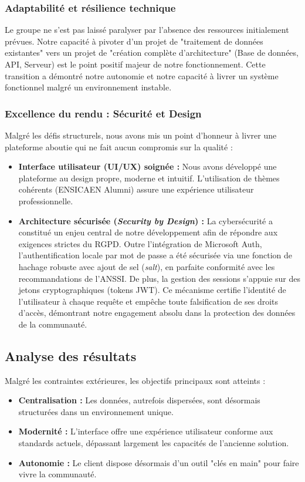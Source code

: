 \documentclass[a4paper,12pt]{article}
\begin{document}
\subsubsection{Adaptabilité et résilience technique}
Le groupe ne s'est pas laissé paralyser par l'absence des ressources initialement prévues. Notre capacité à pivoter d'un projet de "traitement de données existantes" vers un projet de "création complète d'architecture" (Base de données, API, Serveur) est le point positif majeur de notre fonctionnement. Cette transition a démontré notre autonomie et notre capacité à livrer un système fonctionnel malgré un environnement instable.

\subsubsection{Excellence du rendu : Sécurité et Design}
Malgré les défis structurels, nous avons mis un point d'honneur à livrer une plateforme aboutie qui ne fait aucun compromis sur la qualité :
\begin{itemize}[label=\textbullet, itemsep=5pt]
    \item \textbf{Interface utilisateur (UI/UX) soignée :} Nous avons développé une plateforme au design propre, moderne et intuitif. L'utilisation de thèmes cohérents (ENSICAEN Alumni) assure une expérience utilisateur professionnelle.
\item \textbf{Architecture sécurisée (\textit{Security by Design}) :} La cybersécurité a constitué un enjeu central de notre développement afin de répondre aux exigences strictes du RGPD. Outre l'intégration de Microsoft Auth, l'authentification locale par mot de passe a été sécurisée via une fonction de hachage robuste avec ajout de sel (\textit{salt}), en parfaite conformité avec les recommandations de l'ANSSI. De plus, la gestion des sessions s'appuie sur des jetons cryptographiques (tokens JWT). Ce mécanisme certifie l'identité de l'utilisateur à chaque requête et empêche toute falsification de ses droits d'accès, démontrant notre engagement absolu dans la protection des données de la communauté.\end{itemize}

\subsection{Analyse des résultats}
Malgré les contraintes extérieures, les objectifs principaux sont atteints :
\begin{itemize}[label=\textbullet, itemsep=5pt]
    \item \textbf{Centralisation :} Les données, autrefois dispersées, sont désormais structurées dans un environnement unique.
    \item \textbf{Modernité :} L'interface offre une expérience utilisateur conforme aux standards actuels, dépassant largement les capacités de l'ancienne solution.
    \item \textbf{Autonomie :} Le client dispose désormais d'un outil "clés en main" pour faire vivre la communauté.
\end{itemize}
\end{document}
